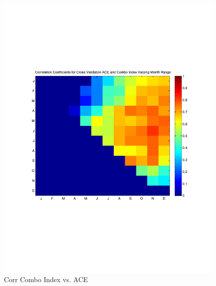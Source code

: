 \documentclass[]{article}
\begin{document}
\begin{figure}[ht]
\begin{minipage}[b]{0.6\linewidth}
\includegraphics[width=\textwidth]{figures/comboIndex/crossValidation/monthlySensitivityTestACE.pdf}
\caption{Corr Combo Index vs. ACE}
\label{fig:figure38}
\end{minipage}
\hspace{0cm}
\begin{minipage}[b]{0.6\linewidth}

\end{minipage}
\end{figure}
\end{document}

